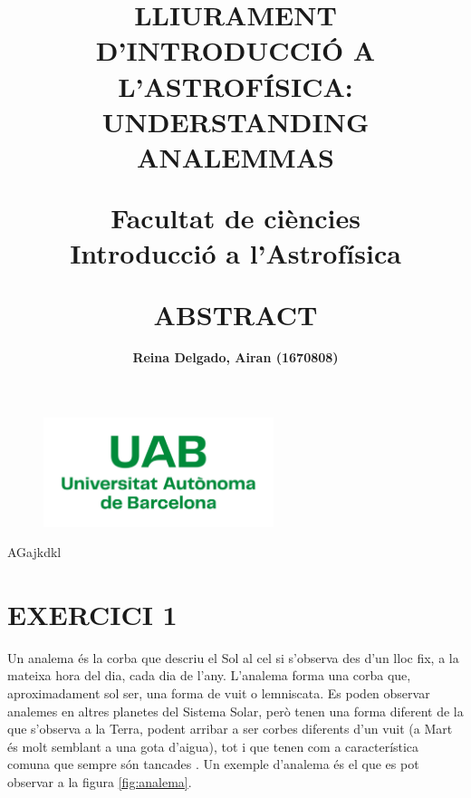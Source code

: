 \documentclass[a4paper, 11pt]{article}
\begin{document}
\begin{figure}
    \centering
    \includegraphics[width=0.6\textwidth]{images/Logo_uab.png}
    \label{uab}
\end{figure}

\title{{\textbf{\Large LLIURAMENT D'INTRODUCCIÓ A L'ASTROFÍSICA: UNDERSTANDING ANALEMMAS
}\\}

\vspace{12mm}

{\large Facultat de ciències}\\
{\large Introducció a l'Astrofísica}}

\author{\textbf{Reina Delgado, Airan (1670808)}}
\date{}


\maketitle

\vspace{30mm} \title{\textbf{\Large ABSTRACT}}



    \vspace{4mm} 
    \noindent AGajkdkl
    \newpage


\section*{EXERCICI 1}

\noindent Un analema és la corba que descriu el Sol al cel si s’observa des d'un lloc fix, a la mateixa hora del dia, cada dia de l’any. L’analema forma una corba que, aproximadament sol ser, una forma de vuit o lemniscata. Es poden observar analemes en altres planetes del Sistema Solar, però tenen una forma diferent de la que s’observa a la Terra, podent arribar a ser corbes diferents d’un vuit (a Mart és molt semblant a una gota d’aigua), tot i que tenen com a característica comuna que sempre són tancades \cite{DEFINICIO_ANALEMA}. Un exemple d’analema és el que es pot observar a la figura \ref{fig:analema}.
\end{document}
